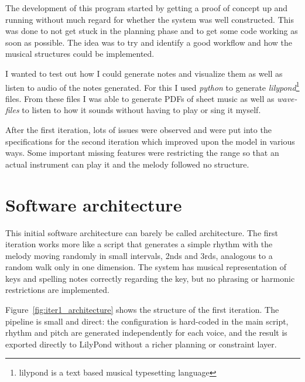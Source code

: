 The development of this program started by getting a proof of concept up and running without much regard for whether the system was well constructed. This was done to not get stuck in the planning phase and to get some code working as soon as possible. The idea was to try and identify a good workflow and how the musical structures could be implemented.


I wanted to test out how I could generate notes and visualize them as well as listen to audio of the notes generated. For this I used \textit{python} to generate \textit{lilypond}\footnote{lilypond is a text based musical typesetting language\cite{LilyPondMusicNotation}} files. From these files I was able to generate PDFs of sheet music as well as \textit{wave-files} to listen to how it sounds without having to play or sing it myself.

After the first iteration, lots of issues were observed and were put into the specifications for the second iteration which improved upon the model in various ways. Some important missing features were restricting the range so that an actual instrument can play it and the melody followed no structure.

\section{Software architecture}
  This initial software architecture can barely be called architecture. The first iteration works more like a script that generates a simple rhythm with the melody moving randomly in small intervals, 2nds and 3rds, analogous to a random walk only in one dimension.
  The system has musical representation of keys and spelling notes correctly regarding the key, but no phrasing or harmonic restrictions are implemented.

  Figure~\ref{fig:iter1_architecture} shows the structure of the first iteration. The pipeline is small and direct: the configuration is hard-coded in the main script, rhythm and pitch are generated independently for each voice, and the result is exported directly to LilyPond without a richer planning or constraint layer.

